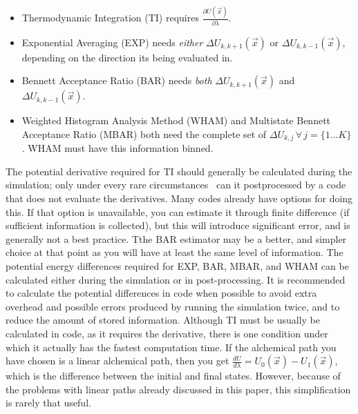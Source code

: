 \documentclass[9pt,bestpractices]{livecoms}
\begin{document}
\begin{itemize}
    \item Thermodynamic Integration (TI) requires $\frac{\partial U(\vec{x})}{\partial\lambda}$.
    \item Exponential Averaging (EXP) needs \textit{either} $\Delta U_{k,k+1}(\vec{x})$ or $\Delta U_{k,k-1}(\vec{x})$, depending on the direction its being evaluated in.
    \item Bennett Acceptance Ratio (BAR) needs \textit{both} $\Delta U_{k,k+1}(\vec{x})$ and $\Delta U_{k,k-1}(\vec{x})$.
    \item Weighted Histogram Analysis Method (WHAM) and Multistate Bennett Acceptance Ratio (MBAR) both need the complete set of $\Delta U_{k,j} \, \forall \, j=\{1...K\}$. WHAM must have this information binned.
\end{itemize}

The potential derivative required for TI should generally be calculated during the simulation; only under every rare circumstances~\cite{Naden:JCTC:2015} can it postprocessed by a code that does not evaluate the derivatives. Many codes already have options for doing this.
If that option is unavailable, you can estimate it through finite difference (if sufficient information is collected), but this  will introduce significant error, and is generally not a best practice. Tthe BAR estimator may be a better, and simpler choice at that point as you will have at least the same level of information. 
The potential energy differences required for EXP, BAR, MBAR, and WHAM can be calculated either during the simulation or in post-processing. It is recommended to calculate the potential differences in code when possible to avoid extra overhead and possible errors produced by running the simulation twice, and to reduce the amount of stored information. 
Although TI must be usually be calculated in code, as it requires the derivative, there is one condition under which it actually has the fastest computation time. 
If the alchemical path you have chosen is a linear alchemical path, then you get $\frac{dU}{d\lambda} = U_0(\vec{x}) - U_1(\vec{x})$, which is the difference between the initial and final states. 
However, because of the problems with linear paths already discussed in this paper, this simplification is rarely that useful.
\end{document}
